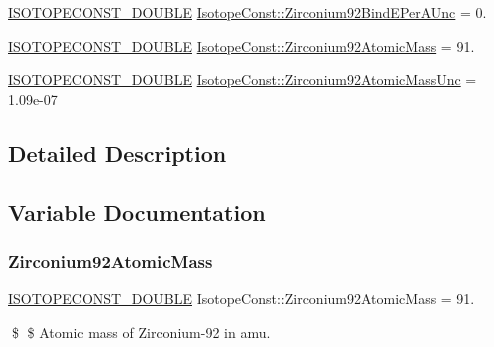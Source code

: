 \begin{DoxyCompactItemize}
\mbox{\hyperlink{group___isotope_const-_macros_ga8f45a7272ce02c0b4c65c44636ed719a}{I\+S\+O\+T\+O\+P\+E\+C\+O\+N\+S\+T\+\_\+\+D\+O\+U\+B\+LE}} \mbox{\hyperlink{group___isotope_const-_zirconium-_zr92_ga46fef60e2a42471ef08efbd62eb1245a}{Isotope\+Const\+::\+Zirconium92\+Bind\+E\+Per\+A\+Unc}} = 0.
\item 
\mbox{\hyperlink{group___isotope_const-_macros_ga8f45a7272ce02c0b4c65c44636ed719a}{I\+S\+O\+T\+O\+P\+E\+C\+O\+N\+S\+T\+\_\+\+D\+O\+U\+B\+LE}} \mbox{\hyperlink{group___isotope_const-_zirconium-_zr92_ga28bc7fda11516e083959fb0dd6173c60}{Isotope\+Const\+::\+Zirconium92\+Atomic\+Mass}} = 91.
\item 
\mbox{\hyperlink{group___isotope_const-_macros_ga8f45a7272ce02c0b4c65c44636ed719a}{I\+S\+O\+T\+O\+P\+E\+C\+O\+N\+S\+T\+\_\+\+D\+O\+U\+B\+LE}} \mbox{\hyperlink{group___isotope_const-_zirconium-_zr92_gaddfd7dcde87d172488a1388f1d919eee}{Isotope\+Const\+::\+Zirconium92\+Atomic\+Mass\+Unc}} = 1.\+09e-\/07
\end{DoxyCompactItemize}


\subsection{Detailed Description}


\subsection{Variable Documentation}
\mbox{\label{group___isotope_const-_zirconium-_zr92_ga28bc7fda11516e083959fb0dd6173c60}} 
\subsubsection{\texorpdfstring{Zirconium92\+Atomic\+Mass}{Zirconium92AtomicMass}}
{\footnotesize\ttfamily \mbox{\hyperlink{group___isotope_const-_macros_ga8f45a7272ce02c0b4c65c44636ed719a}{I\+S\+O\+T\+O\+P\+E\+C\+O\+N\+S\+T\+\_\+\+D\+O\+U\+B\+LE}} Isotope\+Const\+::\+Zirconium92\+Atomic\+Mass = 91.}

\$ \$ Atomic mass of Zirconium-\/92 in amu. \mbox{\label{group___isotope_const-_zirconium-_zr92_gaddfd7dcde87d172488a1388f1d919eee}} 
